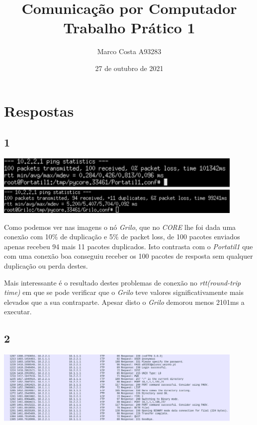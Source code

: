 \documentclass{article}
\title{
    Comunicação por Computador \\
    \large{Trabalho Prático 1}
}
\author{
    Marco Costa A93283
}
\date{27 de outubro de 2021}
\affil{
    Departamento de Informática \\
    Universidade do Minho
}
\begin{document}
    \begin{titlepage}
        \maketitle
    \end{titlepage}
    \section*{Respostas}
        \subsection*{1}
            {
                \centering
                \includegraphics[width=12cm]{images/lol.png}
                \includegraphics[width=12cm]{images/lol-grilo.png}
                \par
            }
                Como podemos ver nas imagens o nó \textit{Grilo}, que no \textit{CORE} lhe foi dada
            uma conexão com 10\% de duplicação e 5\% de packet loss, de 100 pacotes enviados apenas recebeu
            94 mais 11 pacotes duplicados. Isto contrasta com o \textit{Portatil1} que com uma conexão boa conseguiu
            receber os 100 pacotes de resposta sem qualquer duplicação ou perda destes.\par

                Mais interessante é o resultado destes problemas de conexão no \textit{rtt(round-trip time)} em que se pode verificar
            que o \textit{Grilo} teve valores significativamente mais elevados que a sua contraparte. Apesar disto o \textit{Grilo} demorou
            menos 2101ms a executar.
        \subsection*{2}
            {
                \centering
                \includegraphics[width=12cm]{images/ftp-wireshark.png}
                \par
            }
\end{document}
